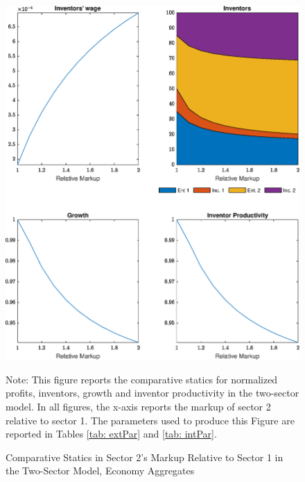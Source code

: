 \begin{figure}[th]
\begin{centering}
\caption{Comparative Statics in Sector 2's Markup Relative to Sector 1 in the
Two-Sector Model, Economy Aggregates \label{fig:TwoSecAgg}}
\includegraphics[width=1\columnwidth]{graphs/GE_aggregates}
\par\end{centering}
\raggedright{}{\small{}Note: This figure reports the comparative statics
for normalized profits, inventors, growth and inventor productivity
in the two-sector model. In all figures, the x-axis reports the markup
of sector 2 relative to sector 1. The parameters used to produce this
Figure are reported in Tables \ref{tab: extPar} and \ref{tab: intPar}.}{\small\par}
\end{figure}
